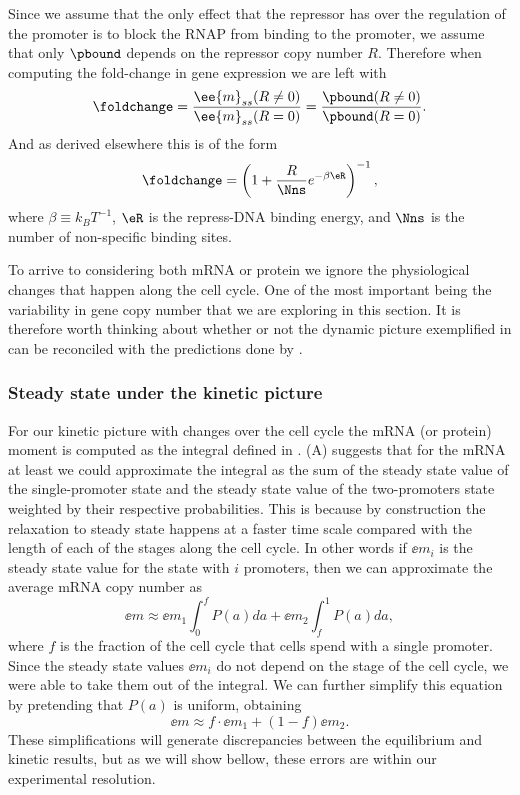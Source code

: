 Since we assume that the only effect that the repressor has over the regulation
of the promoter is to block the RNAP from binding to the promoter, we assume
that only $\pbound$ depends on the repressor copy number $R$. Therefore when
computing the fold-change in gene expression we  are left with
\begin{equation}
  \foldchange = {\ee{m}_{ss}(R \neq 0) \over \ee{m}_{ss}(R = 0)}
              = {\pbound (R \neq 0) \over \pbound (R = 0)}.
\end{equation}
And as derived elsewhere this is of the form \cite{Garcia2011c}
\begin{equation}
  \foldchange = \left(1 + {R \over \Nns}e^{-\beta \eR}  \right)^{-1},
  \label{eq_fold_change_thermo}
\end{equation}
where $\beta \equiv k_BT^{-1}$, $\eR$ is the repress-DNA binding energy, and
$\Nns$ is the number of non-specific binding sites.

To arrive to  considering both mRNA or protein we
ignore the physiological changes that happen along the cell cycle. One of the
most important being the variability in gene copy number that we are exploring
in this section. It is therefore worth thinking about whether or not the dynamic
picture exemplified in  can be reconciled with the
predictions done by .

\subsubsection{Steady state under the kinetic picture}

For our kinetic picture with changes over the cell cycle the mRNA (or protein)
moment is computed as the integral defined in .
(A) suggests that for the mRNA at least we could
approximate the integral as the sum of the steady state value of the
single-promoter state and the steady state value of the two-promoters state
weighted by their respective probabilities. This is because by construction the
relaxation to steady state happens at a faster time scale compared with the
length of each of the stages along the cell cycle. In other words if $\ee{m}_i$
is the steady state value for the state with $i$ promoters, then we can
approximate the average mRNA copy number as
\begin{equation}
  \ee{m} \approx \ee{m}_1 \int_0^{f} P(a)da +
                 \ee{m}_2 \int_f^{1} P(a)da,
\end{equation}
where $f$ is the fraction of the cell cycle that cells spend with a single
promoter. Since the steady state values $\ee{m}_i$ do not depend on the stage
of the cell cycle, we were able to take them out of the integral. We can further
simplify this equation by pretending that $P(a)$ is uniform, obtaining
\begin{equation}
  \ee{m} \approx f \cdot \ee{m}_1 + (1 - f) \ee{m}_2.
  \label{eq_mRNA_mean_simplified}
\end{equation}
These simplifications will generate discrepancies between the equilibrium and
kinetic results, but as we will show bellow, these errors are within our
experimental resolution.

